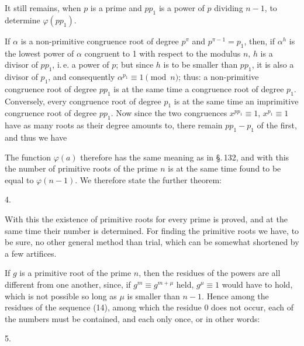 
It still remains, when $p$ is a prime and $pp_1$ is a power of $p$
dividing $n-1$, to determine $\varphi(pp_1)$.

If $\alpha$ is a non-primitive congruence root of degree $p^{\pi}$ and
$p^{\pi-1} = p_1$, then, if $\alpha^h$ is the lowest power of $\alpha$
congruent to 1 with respect to the modulus $n$, $h$ is a divisor of $pp_1$,
i.\,e. a power of $p$; but since $h$ is to be smaller than $pp_1$, it
is also a divisor of $p_1$, and consequently $\alpha^{p_1} \equiv 1
\pmod{n}$; thus: a non-primitive congruence root of degree $pp_1$
is at the same time a congruence root of degree $p_1$. Conversely, every
congruence root of degree $p_1$ is at the same time an imprimitive
congruence root of degree $pp_1$. Now since the two congruences
$x^{pp_1} \equiv 1$, $x^{p_1} \equiv 1$ have as many roots as their
degree amounts to, there remain $pp_1 - p_1$ 
of the first, and thus we have

The function $\varphi(a)$ therefore has the same meaning as in \S.\,132,
and with this the number of primitive roots of the prime
$n$ is at the same time found to be equal to $\varphi(n-1)$. We therefore state the further theorem:

4.\ 

With this the existence of primitive roots for every prime is
proved, and at the same time their number is determined. For finding the
primitive roots we have, to be sure, no other general method
than trial, which can be somewhat shortened by a few
artifices.

If $g$ is a primitive root of the prime $n$, then the residues of the
powers
are all different from one another, since, if $g^m \equiv g^{m+\mu}$ held,
$g^{\mu} \equiv 1$ would have to hold, which is not possible so long as $\mu$
is smaller than $n-1$. Hence among the residues of the sequence (14),
among which the residue 0 does not occur, each of the numbers
must be contained, and each only once, or in other words:

5.\ 
